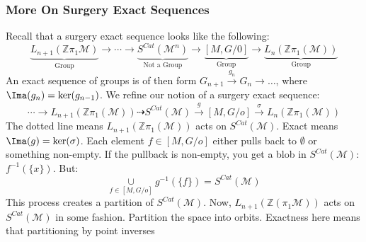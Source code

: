 \documentclass[crop=false,class=book,oneside]{standalone}
\begin{document}
        \subsubsection{More On Surgery Exact Sequences}
            Recall that a surgery exact sequence
            looks like the following:
            \begin{equation*}
                \underset{\textrm{Group}}
                {\underbrace{L_{n+1}(\mathbb{Z}\pi_{1}\mathcal{M})}}
                \rightarrow\cdots\rightarrow
                \underset{\textrm{Not a Group}}
                {\underbrace{S^{Cat}(\mathcal{M}^{n})}}
                \rightarrow
                \underset{\textrm{Group}}
                {\underbrace{[M,G/0]}}
                \rightarrow \underset{\textrm{Group}}
                {\underbrace{L_{n}(\mathbb{Z}\pi_{1}(\mathcal{M}))}} 
            \end{equation*}
            An exact sequence of groups is of then form
            $G_{n+1}\overset{g_{n}}{\rightarrow}%
             G_{n}\rightarrow \hdots$,
             where $\Ima(g_n)=\ker(g_{n-1})$.
             We refine our notion of a surgery exact sequence:
            \begin{equation*}
                \cdots\rightarrow
                L_{n+1}(\mathbb{Z}\pi_{1}(\mathcal{M}))
                \dashrightarrow{S^{Cat}}(\mathcal{M})
                \overset{g}{\rightarrow}[M,G/o]
                \overset{\sigma}{\rightarrow}
                L_{n}(\mathbb{Z}\pi_{1}(\mathcal{M}))
            \end{equation*}
            The dotted line means
            $L_{n+1}(\mathbb{Z}\pi_{1}(\mathcal{M}))$
            acts on $S^{Cat}(\mathcal{M})$.
            Exact means $\Ima(g)=\ker(\sigma)$.
            Each element $f\in{[M,G/o]}$
            either pulls back to $\emptyset$ or
            something non-empty. If the pullback is non-empty,
            you get a blob in
            $S^{Cat}(\mathcal{M})$: $f^{-1}(\{x\})$.
            But:
            \begin{equation*}
                \underset{f\in[M,G/o]}{\cup}g^{-1}(\{f\})
                =S^{Cat}(\mathcal{M})
            \end{equation*}
            This process creates a partition of
            $S^{Cat}(\mathcal{M})$. Now,
            $L_{n+1}(\mathbb{Z}(\pi_{1}\mathcal{M}))$
            acts on $S^{Cat}(\mathcal{M})$ in some fashion.
            Partition the space into orbits. Exactness
            here means that partitioning by point inverses
\end{document}
